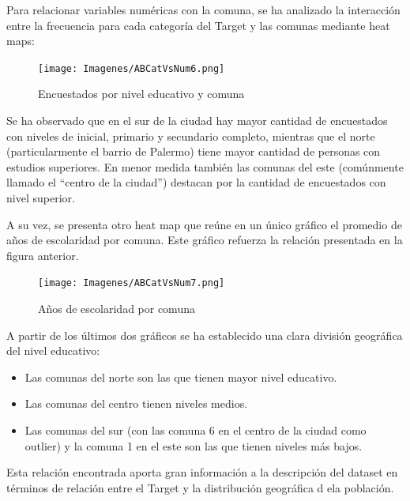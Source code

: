 \documentclass[a4paper]{article}
\begin{document}
            Para relacionar variables numéricas con la comuna, se ha analizado la interacción entre la frecuencia para cada categoría del Target y las comunas mediante heat maps: 
 
            \begin{figure}[H]
            \centering
                \texttt{[image: Imagenes/ABCatVsNum6.png]}
                \caption{Encuestados por nivel educativo y comuna}
                \label{AB education level and location}
            \end{figure}
 
            Se ha observado que en el sur de la ciudad hay  mayor cantidad de encuestados con niveles de inicial, primario y secundario completo, mientras que el norte (particularmente el barrio de Palermo) tiene mayor cantidad de personas con estudios superiores. En menor medida también las comunas del este (comúnmente llamado el ``centro de la ciudad'') destacan por la cantidad de encuestados con nivel superior.

\vspace{1cm}

            A su vez, se presenta otro heat map que reúne en un único gráfico el promedio de años de escolaridad por comuna. Este gráfico refuerza la relación presentada en la figura anterior.

            \begin{figure}[H]
            \centering
                \texttt{[image: Imagenes/ABCatVsNum7.png]}
                \caption{Años de escolaridad por comuna}
                \label{AB years of education and location}
            \end{figure}
 
            A partir de los últimos dos gráficos se ha establecido una clara división geográfica del nivel educativo:
            \begin{itemize}
                \item Las comunas del norte son las que tienen mayor nivel educativo.
                \item Las comunas del centro tienen niveles medios.
                \item Las comunas del sur (con las comuna 6 en el centro de la ciudad como outlier) y la comuna 1 en el este son las que tienen niveles más bajos.
            \end{itemize}

            Esta relación encontrada aporta gran información a la descripción del dataset en términos de relación entre el Target y la distribución geográfica d ela población.
    
\end{document}
